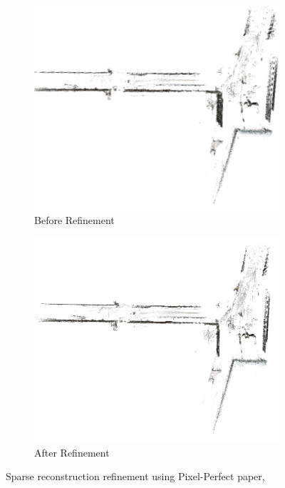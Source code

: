 \documentclass[11pt]{article}
\begin{document}
    \begin{figure}
        \centering
        \begin{subfigure}{0.45\textwidth}
            \centering
            \includegraphics[width=\linewidth]{images/method/refine_before}
            \caption{Before Refinement}
        \end{subfigure}
        \hfill
        \begin{subfigure}{0.45\textwidth}
            \centering
            \includegraphics[width=\linewidth]{images/method/refine_after}
            \caption{After Refinement}
        \end{subfigure}
        \caption{Sparse reconstruction refinement using Pixel-Perfect paper, \cite{lindenberger2021pixsfm}}
        \label{fig:ref_sfm}
    \end{figure}
\end{document}

